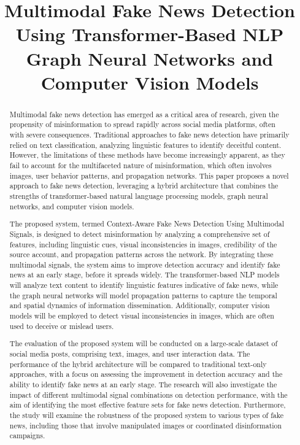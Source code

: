 \documentclass[conference]{IEEEtran}
\begin{document}
\title{Multimodal Fake News Detection Using Transformer-Based NLP Graph Neural Networks and Computer Vision Models}

\author{
}

\maketitle

\begin{abstract}
Multimodal fake news detection has emerged as a critical area of research, given the propensity of misinformation to spread rapidly across social media platforms, often with severe consequences. Traditional approaches to fake news detection have primarily relied on text classification, analyzing linguistic features to identify deceitful content. However, the limitations of these methods have become increasingly apparent, as they fail to account for the multifaceted nature of misinformation, which often involves images, user behavior patterns, and propagation networks. This paper proposes a novel approach to fake news detection, leveraging a hybrid architecture that combines the strengths of transformer-based natural language processing models, graph neural networks, and computer vision models.

The proposed system, termed Context-Aware Fake News Detection Using Multimodal Signals, is designed to detect misinformation by analyzing a comprehensive set of features, including linguistic cues, visual inconsistencies in images, credibility of the source account, and propagation patterns across the network. By integrating these multimodal signals, the system aims to improve detection accuracy and identify fake news at an early stage, before it spreads widely. The transformer-based NLP models will analyze text content to identify linguistic features indicative of fake news, while the graph neural networks will model propagation patterns to capture the temporal and spatial dynamics of information dissemination. Additionally, computer vision models will be employed to detect visual inconsistencies in images, which are often used to deceive or mislead users.

The evaluation of the proposed system will be conducted on a large-scale dataset of social media posts, comprising text, images, and user interaction data. The performance of the hybrid architecture will be compared to traditional text-only approaches, with a focus on assessing the improvement in detection accuracy and the ability to identify fake news at an early stage. The research will also investigate the impact of different multimodal signal combinations on detection performance, with the aim of identifying the most effective feature sets for fake news detection. Furthermore, the study will examine the robustness of the proposed system to various types of fake news, including those that involve manipulated images or coordinated disinformation campaigns.


\end{abstract}
\end{document}
